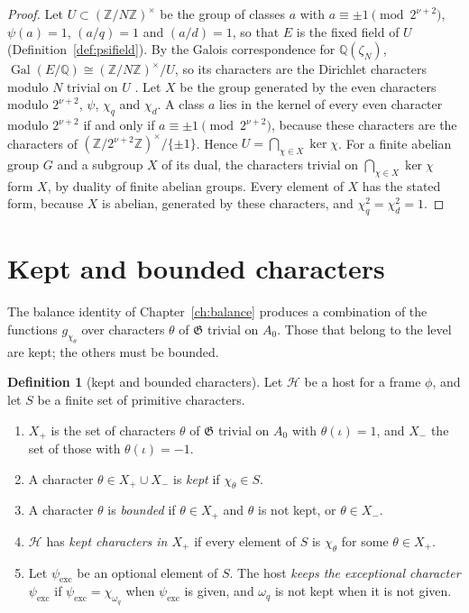 \documentclass[11pt]{amsbook}
\theoremstyle{plain}
\theoremstyle{definition}
\newtheorem{definition}[theorem]{Definition}
\theoremstyle{remark}
\numberwithin{equation}{section}
\numberwithin{figure}{chapter}
\numberwithin{table}{chapter}
\newcommand{\Q}{\mathbb{Q}}
\newcommand{\Z}{\mathbb{Z}}
\newcommand{\Gal}{\operatorname{Gal}}
\newcommand{\GG}{\mathfrak{G}}
\begin{document}
\begin{proof}
Let $U\subset(\Z/N\Z)^\times$ be the group of classes $a$ with
$a\equiv\pm1\pmod{2^{\nu+2}}$, $\psi(a)=1$, $(a/q)=1$ and $(a/d)=1$,
so that $E$ is the fixed field of $U$ (Definition~\ref{def:psifield}).
By the Galois
correspondence for $\Q(\zeta_N)$, $\Gal(E/\Q)\cong(\Z/N\Z)^\times/U$, so its
characters are the Dirichlet characters
modulo $N$ trivial on $U$ \cite{Washington1997}. Let $X$ be the group
generated by the even characters modulo $2^{\nu+2}$, $\psi$, $\chi_q$
and $\chi_d$. A class $a$ lies in the kernel of every even character
modulo $2^{\nu+2}$ if and only if $a\equiv\pm1\pmod{2^{\nu+2}}$,
because these characters are the characters of
$(\Z/2^{\nu+2}\Z)^\times/\{\pm1\}$. Hence $U=\bigcap_{\chi\in X}\ker
\chi$. For a finite abelian group $G$ and a subgroup $X$ of its dual,
the characters trivial on $\bigcap_{\chi\in X}\ker\chi$ form $X$, by
duality of finite abelian groups. Every element of $X$ has the stated
form, because $X$ is abelian, generated by these characters, and
$\chi_q^2=\chi_d^2=1$.
\end{proof}

\section{Kept and bounded characters}

The balance identity of Chapter~\ref{ch:balance} produces a
combination of the functions $g_{\chi_\theta}$ over characters
$\theta$ of $\GG$ trivial on $A_0$. Those that belong to the level are
kept; the others must be bounded.

\begin{definition}[kept and bounded characters]\label{def:bounded}
Let $\mathcal H$ be a host for a frame $\phi$, and let $S$ be a finite
set of primitive characters.
\begin{enumerate}[label=(\arabic*)]
\item $X_+$ is the set of characters $\theta$ of $\GG$ trivial on
$A_0$ with $\theta(\iota)=1$, and $X_-$ the set of those with
$\theta(\iota)=-1$.
\item A character $\theta\in X_+\cup X_-$ is \emph{kept} if
$\chi_\theta\in S$.
\item A character $\theta$ is \emph{bounded} if $\theta\in X_+$ and
$\theta$ is not kept, or $\theta\in X_-$.
\item $\mathcal H$ has \emph{kept characters in $X_+$} if every
element of $S$ is $\chi_\theta$ for some $\theta\in X_+$.
\item Let $\psi_{\mathrm{exc}}$ be an optional element of $S$. The
host \emph{keeps the exceptional character} $\psi_{\mathrm{exc}}$ if
$\psi_{\mathrm{exc}}=\chi_{\omega_q}$ when $\psi_{\mathrm{exc}}$ is
given, and $\omega_q$ is not kept when it is not given.
\end{enumerate}
\end{definition}
\end{document}
